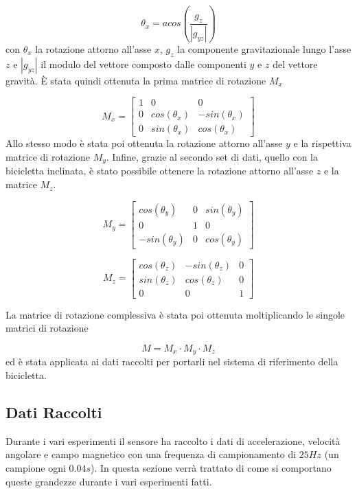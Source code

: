 \documentclass[class=article]{standalone}
\begin{document}
	\[\theta_{x}=acos\left(\frac{g_{z}}{|g_{yz}|}\right)\]
	con \(\theta_{x}\) la rotazione attorno all'asse \(x\), \(g_{z}\) la componente gravitazionale lungo l'asse \(z\) e \(|g_{yz}|\) il modulo del vettore composto dalle componenti \(y\) e \(z\) del vettore gravità. È stata quindi ottenuta la prima matrice di rotazione \(M_{x}\)
	
	\[M_{x}= \begin{bmatrix}
		1 & 0 & 0 \\
		0 & cos(\theta_{x}) & -sin(\theta_{x}) \\
		0 & sin(\theta_{x}) & cos(\theta_{x})
	\end{bmatrix}\]
	Allo stesso modo è stata poi ottenuta la rotazione attorno all'asse \(y\) e la rispettiva matrice di rotazione \(M_{y}\). Infine, grazie al secondo set di dati, quello con la bicicletta inclinata, è stato possibile ottenere la rotazione attorno all'asse \(z\) e la matrice \(M_{z}\).
	
	\[M_{y}=\begin{bmatrix}
		cos(\theta_{y}) & 0 & sin(\theta_{y}) \\
		0 & 1 & 0 \\
		-sin(\theta_{y}) & 0 & cos(\theta_{y})
	\end{bmatrix}\]
	
	\[M_{z}=\begin{bmatrix}
		cos(\theta_{z}) & -sin(\theta_{z}) & 0 \\
		sin(\theta_{z}) & cos(\theta_{z}) & 0 \\
		0 & 0 & 1
	\end{bmatrix}\]
	
	La matrice di rotazione complessiva è stata poi ottenuta moltiplicando le singole matrici di rotazione 
	
	\[M=M_{x}\cdot M_{y}\cdot M_{z}\]
	ed è stata applicata ai dati raccolti per portarli nel sistema di riferimento della bicicletta.
	
	\subsection{Dati Raccolti}
	Durante i vari esperimenti il sensore ha raccolto i dati di accelerazione, velocità angolare e campo magnetico con una frequenza di campionamento di \(25Hz\) (un campione ogni \(0.04s\)). In questa sezione verrà trattato di come si comportano queste grandezze durante i vari esperimenti fatti.
	
\end{document}

